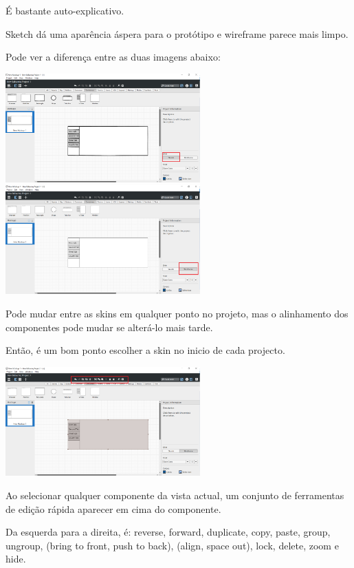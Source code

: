\documentclass{tufte-book} %
\begin{document}
É bastante auto-explicativo.

Sketch dá uma aparência áspera para o protótipo e wireframe parece mais limpo.

Pode ver a diferença entre as duas imagens abaixo:

\begin{center}
	\includegraphics[width=7.50cm]{img6.png}
	\hfill
	\includegraphics[width=7.50cm]{img7.png}
\end{center}

Pode mudar entre as skins em qualquer ponto no projeto, mas o alinhamento dos componentes pode mudar se alterá-lo mais tarde.

Então, é um bom ponto escolher a skin no inicio de cada projecto.

\begin{center}
	\includegraphics[width=7.50cm]{img8.png}
\end{center}

Ao selecionar qualquer componente da vista actual, um conjunto de ferramentas de edição rápida aparecer em cima do componente.

Da esquerda para a direita, é: reverse, forward, duplicate, copy, paste, group, ungroup, (bring to front, push to back), (align, space out), lock, delete, zoom e hide.
\end{document}
